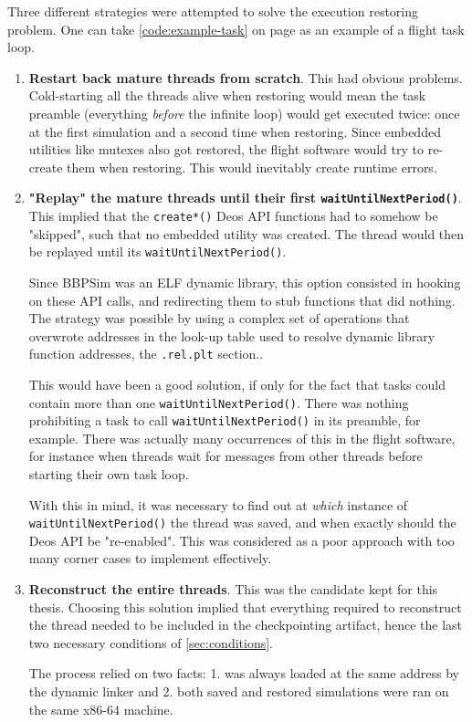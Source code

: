 Three different strategies were attempted to solve the execution restoring problem. One can take \autoref{code:example-task} on page \pageref{code:example-task} as an example of a flight task loop.
\begin{enumerate}
	\item \textbf{Restart back mature threads from scratch}. This had obvious problems.  Cold-starting all the threads alive when restoring would mean the task preamble (everything \textit{before} the infinite loop) would get executed twice: once at the first simulation and a second time when restoring. Since embedded utilities like mutexes also got restored, the flight software would try to re-create them when restoring. This would inevitably create runtime errors.
	
	\item \textbf{"Replay" the mature threads until their first \texttt{waitUntilNextPeriod()}}. This implied that the \texttt{create*()} Deos API functions had to somehow be "skipped", such that no embedded utility was created. The thread would then be replayed until its \texttt{waitUntilNextPeriod()}.
	
	Since \gls{BBPSim} was an \gls{ELF} dynamic library, this option consisted in hooking on these API calls, and redirecting them to stub functions that did nothing. The strategy was possible by using a complex set of operations that overwrote addresses in the look-up table used to resolve dynamic library function addresses, the \texttt{.rel.plt} section.\cite{online:shoumikhin}.
	
	This would have been a good solution, if only for the fact that tasks could contain more than one \texttt{waitUntilNextPeriod()}. There was nothing prohibiting a task to call \texttt{waitUntilNextPeriod()} in its preamble, for example. There was actually many occurrences of this in the flight software, for instance when threads wait for messages from other threads before starting their own task loop.
	
	With this in mind, it was necessary to find out at \textit{which} instance of \texttt{waitUntilNextPeriod()} the thread was saved, and when exactly should the Deos API be "re-enabled". This was considered as a poor approach with too many corner cases to implement effectively.
	
	\item \textbf{Reconstruct the entire threads}. This was the candidate kept for this thesis. Choosing this solution implied that everything required to reconstruct the thread needed to be included in the checkpointing artifact, hence the last two necessary conditions of \autoref{sec:conditions}. 
	
	The process relied on two facts: 1. was always loaded at the same address by the dynamic linker and 2. both saved and restored simulations were ran on the same x86-64 machine. 
\end{enumerate}

